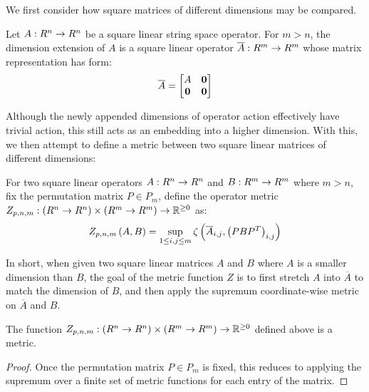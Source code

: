 We first consider how square matrices of different dimensions may be compared.

\begin{definition}
  Let \(A : R^n \to R^n\) be a square linear string space operator.
  For \(m > n\),
  the dimension extension of \(A\)
  is a square linear operator \(\overline{A} : R^m \to R^m\)
  whose matrix representation has form:
  \begin{align*}
    \overline{A} = \begin{bmatrix} A & \mathbf{0} \\ \mathbf{0} & \mathbf{0} \end{bmatrix}
  \end{align*}
\end{definition}

Although the newly appended dimensions of operator action
effectively have trivial action, this still acts as an embedding into
a higher dimension.
With this, we then attempt to define a metric between
two square linear matrices of different dimensions:
\begin{definition}
  For two square linear operators
  \(A : R^n \to R^n\) and \(B : R^m \to R^m\) where \(m > n\),
  fix the permutation matrix \(P \in P_m\),
  define the operator metric
  \(Z_{p, n, m} : \left(R^n \to R^n\right) \times \left(R^m \to R^m\right) \to \mathbb{R}^{\geq 0}\) as:
  \begin{align*}
    Z_{p, n, m}\left(A, B\right) =
      \sup_{1 \leq i, j \leq m}
        \zeta\left(\overline{A}_{i, j}, \left(PB{P}^T\right)_{i, j}\right)
  \end{align*}
\end{definition}
In short, when given two square linear matrices
\(A\) and \(B\) where \(A\)
is a smaller dimension than \(B\), the goal of the metric function \(Z\)
is to first stretch \(A\) into \(\overline{A}\)
to match the dimension of \(B\),
and then apply the supremum coordinate-wise metric
on \(\overline{A}\) and \(B\).

\begin{theorem}
  The function
  \(Z_{p, n, m} : \left(R^n \to R^n\right) \times \left(R^m \to R^m\right) \to \mathbb{R}^{\geq 0}\) 
  defined above is a metric.
\end{theorem}
\begin{proof}
  Once the permutation matrix \(P \in P_m\) is fixed, this reduces to
  applying the supremum over a finite set of metric functions
  for each entry of the matrix.
\end{proof}


